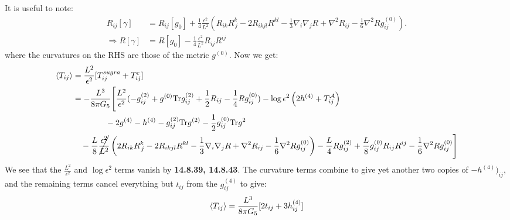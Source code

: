 \documentclass[11pt, class=article, crop=false]{standalone}
\begin{document}
\begin{enumerate}
	It is useful to note:
	\[
	\begin{aligned}
		R_{ij}[\gamma] &= R_{ij} [g_0] + \frac14 \frac{\epsilon^2}{L^2} \left(R_{ik} R^{k}_{\, j} - 2 R_{ikjl}  R^{kl} - \frac13 \nabla_i \nabla_j R + \nabla^2 R_{ij} - \frac16 \nabla^2 R g_{ij}^{(0)}\right).\\
		\Rightarrow R[\gamma] &= R[g_0] - \frac14 \frac{\epsilon^2}{L^2} R_{ij} R^{ij}
	\end{aligned}
	\]
	where the curvatures on the RHS are those of the metric $g^{(0)}$. Now we get:
	\[
	\begin{aligned}
		\braket{T_{ij}} &= \frac{L^2}{\epsilon^2} [T^{sugra}_{ij} + T^c_{ij}] \\
		&= -\frac{L^3}{8 \pi G_5} \Bigg[\frac{L^2}{\epsilon^2} (-g^{(2)}_{ij} + g^{(0)} \mathrm{Tr} g^{(2)}_{ij} + \frac12 R_{ij} - \frac14 R g_{ij}^{(0)}) - \log \epsilon^2 \left(2 h^{(4)} +  T^{\mathcal A}_{ij} \right)\\
		&\qquad \qquad -2 g^{(4)} - h^{(4)} - g_{ij}^{(2)} \mathrm{Tr} g^{(2)} - \frac12 g^{(0)}_{ij} \mathrm{Tr} g^2
		\\
		& \quad - \frac{L}{8} \cancel{\frac{\epsilon^2}{L^2}} \left(2 R_{ik} R^{k}_{\, j} - 2 R_{ikjl}  R^{kl} - \frac13 \nabla_i \nabla_j R + \nabla^2 R_{ij} - \frac16 \nabla^2 R g_{ij}^{(0)}\right) - \frac{L}{4} R g^{(2)}_{ij} + \frac{L}{8} g^{(0)}_{ij}  R_{ij} R^{ij} - \frac16 \nabla^2 R g^{(0)}_{ij}
		 \Bigg]
	\end{aligned}
	\]
	We see that the $\frac{L^2}{\epsilon^2}$ and $\log \epsilon^2$ terms vanish by \textbf{14.8.39, 14.8.43}. The curvature terms combine to give yet another two copies of $-h^{(4)})_{ij}$, and the remaining terms cancel everything but $t_{ij}$ from the $g^{(4)}_{ij}$ to give:
	\[
		\braket{T_{ij}} = \frac{L^3}{8 \pi G_5}[2 t_{ij} + 3 h^{(4)}_{ij}]
	\]
	

\end{enumerate}
\end{document}
